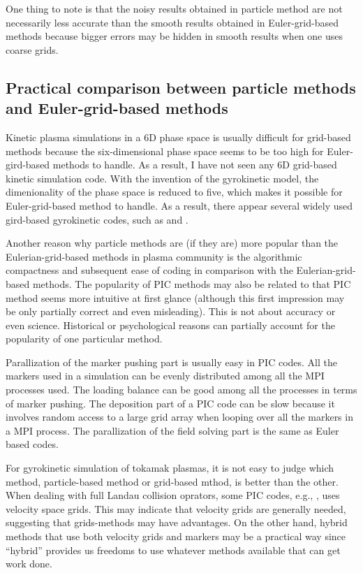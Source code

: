 \documentclass{article}
\newcommand{\tmtexttt}[1]{{\ttfamily{#1}}}
\begin{document}
One thing to note is that the noisy results obtained in particle method are
not necessarily less accurate than the smooth results obtained in
Euler-grid-based methods because bigger errors may be hidden in smooth results
when one uses coarse grids.

\subsection{Practical comparison between particle methods and Euler-grid-based
methods}

Kinetic plasma simulations in a 6D phase space is usually difficult for
grid-based methods because the six-dimensional phase space seems to be too
high for Euler-gird-based methods to handle. As a result, I have not seen any
6D grid-based kinetic simulation code. With the invention of the gyrokinetic
model, the dimenionality of the phase space is reduced to five, which makes it
possible for Euler-grid-based method to handle. As a result, there appear
several widely used gird-based gyrokinetic codes, such as \tmtexttt{GYRO} and
\tmtexttt{GENE}.

Another reason why particle methods are (if they are) more popular than the
Eulerian-grid-based methods in plasma community is the algorithmic compactness
and subsequent ease of coding in comparison with the Eulerian-grid-based
methods. The popularity of PIC methods may also be related to that PIC method
seems more intuitive at first glance (although this first impression may be
only partially correct and even misleading). This is not about accuracy or
even science. Historical or psychological reasons can partially account for
the popularity of one particular method.

Parallization of the marker pushing part is usually easy in PIC codes. All the
markers used in a simulation can be evenly distributed among all the MPI
processes used. The loading balance can be good among all the processes in
terms of marker pushing. The deposition part of a PIC code can be slow because
it involves random access to a large grid array when looping over all the
markers in a MPI process. The parallization of the field solving part is the
same as Euler based codes.

For gyrokinetic simulation of tokamak plasmas, it is not easy to judge which
method, particle-based method or grid-based mthod, is better than the other.
When dealing with full Landau collision oprators, some PIC codes, e.g.,
\tmtexttt{XGC}, uses velocity space grids. This may indicate that velocity
grids are generally needed, suggesting that grids-methods may have advantages.
On the other hand, hybrid methods that use both velocity grids and markers may
be a practical way since ``hybrid'' provides us freedoms to use whatever
methods available that can get work done.
\end{document}
